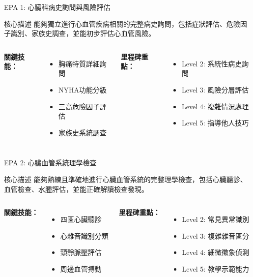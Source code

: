 \documentclass[aspectratio=169]{beamer}
\begin{document}
\begin{frame}{EPA 1: 心臟科病史詢問與風險評估}
\begin{alertblock}{核心描述}
能夠獨立進行心血管疾病相關的完整病史詢問，包括症狀評估、危險因子識別、家族史調查，並能初步評估心血管風險。
\end{alertblock}

\begin{columns}[c]
\textbf{關鍵技能：}
\begin{itemize}
\item 胸痛特質詳細詢問
\item NYHA功能分級
\item 三高危險因子評估
\item 家族史系統調查
\end{itemize}

\textbf{里程碑重點：}
\begin{itemize}
\item Level 2: 系統性病史詢問
\item Level 3: 風險分層評估
\item Level 4: 複雜情況處理
\item Level 5: 指導他人技巧
\end{itemize}
\end{columns}
\end{frame}

\begin{frame}{EPA 2: 心臟血管系統理學檢查}
\begin{alertblock}{核心描述}
能夠熟練且準確地進行心臟血管系統的完整理學檢查，包括心臟聽診、血管檢查、水腫評估，並能正確解讀檢查發現。
\end{alertblock}

\begin{columns}[c]
\textbf{關鍵技能：}
\begin{itemize}
\item 四區心臟聽診
\item 心雜音識別分類
\item 頸靜脈壓評估
\item 周邊血管搏動
\end{itemize}

\textbf{里程碑重點：}
\begin{itemize}
\item Level 2: 常見異常識別
\item Level 3: 複雜雜音區分
\item Level 4: 細微徵象偵測
\item Level 5: 教學示範能力
\end{itemize}
\end{columns}
\end{frame}
\end{document}
